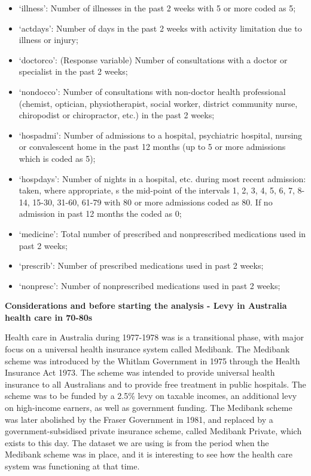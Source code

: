 \documentclass[
]{article}
\providecommand{\tightlist}{%
  \setlength{\itemsep}{0pt}\setlength{\parskip}{0pt}}
\begin{document}
\begin{itemize}
  \begin{itemize}
  \tightlist
  \item
    `illness': Number of illnesses in the past 2 weeks with 5 or more
    coded as 5;
  \item
    `actdays': Number of days in the past 2 weeks with activity
    limitation due to illness or injury;
  \item
    `doctorco': (Response variable) Number of consultations with a
    doctor or specialist in the past 2 weeks;
  \item
    `nondocco': Number of consultations with non-doctor health
    professional (chemist, optician, physiotherapist, social worker,
    district community nurse, chiropodist or chiropractor, etc.) in the
    past 2 weeks;
  \item
    `hospadmi': Number of admissions to a hospital, psychiatric
    hospital, nursing or convalescent home in the past 12 months (up to
    5 or more admissions which is coded as 5);
  \item
    `hospdays': Number of nights in a hospital, etc. during most recent
    admission: taken, where appropriate, s the mid-point of the
    intervals 1, 2, 3, 4, 5, 6, 7, 8-14, 15-30, 31-60, 61-79 with 80 or
    more admissions coded as 80. If no admission in past 12 months the
    coded as 0;
  \item
    `medicine': Total number of prescribed and nonprescribed medications
    used in past 2 weeks;
  \item
    `prescrib': Number of prescribed medications used in past 2 weeks;
  \item
    `nonpresc': Number of nonprescribed medications used in past 2
    weeks;
  \end{itemize}
\end{itemize}

\textbf{Considerations and before starting the analysis - Levy in
Australia health care in 70-80s}

Health care in Australia during 1977-1978 was is a transitional phase,
with major focus on a universal health insurance system called Medibank.
The Medibank scheme was introduced by the Whitlam Government in 1975
through the Health Insurance Act 1973. The scheme was intended to
provide universal health insurance to all Australians and to provide
free treatment in public hospitals. The scheme was to be funded by a
2.5\% levy on taxable incomes, an additional levy on high-income
earners, as well as government funding. The Medibank scheme was later
abolished by the Fraser Government in 1981, and replaced by a
government-subsidised private insurance scheme, called Medibank Private,
which exists to this day. The dataset we are using is from the period
when the Medibank scheme was in place, and it is interesting to see how
the health care system was functioning at that time.
\end{document}
